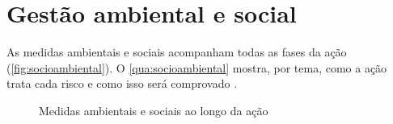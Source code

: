 \section{Gestão ambiental e social}
\label{sec:salvaguardas}

As medidas ambientais e sociais acompanham todas as fases da ação
(\autoref{fig:socioambiental}). O \autoref{qua:socioambiental} mostra, por
tema, como a ação trata cada risco e como isso será comprovado
\cite[Quadros 25 e 26]{mop2026}.

\begin{figure}[htbp]
  \centering
  \caption{Medidas ambientais e sociais ao longo da ação}
  \label{fig:socioambiental}
\end{figure}

